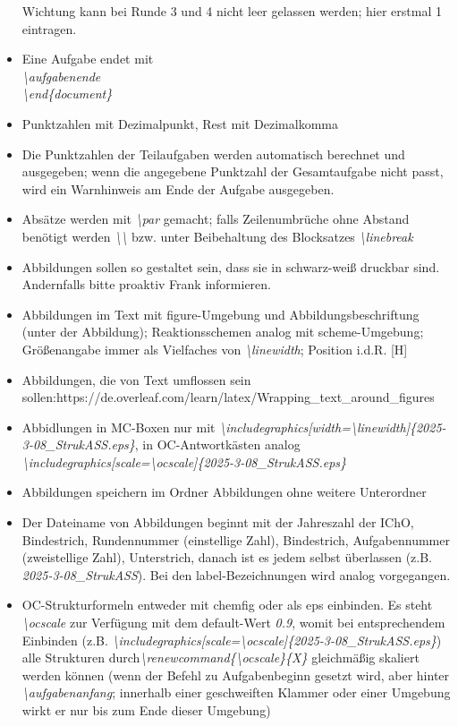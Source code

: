 \documentclass[./main.tex]{subfiles}
\begin{document}
\begin{itemize}
    Wichtung kann bei Runde 3 und 4 nicht leer gelassen werden; hier erstmal 1 eintragen.
    \item Eine Aufgabe endet mit \\
    \textit{\textbackslash aufgabenende}\\\textit{\textbackslash end\{document\}}
    \item Punktzahlen mit Dezimalpunkt, Rest mit Dezimalkomma
    \item Die Punktzahlen der Teilaufgaben werden automatisch berechnet und ausgegeben; wenn die angegebene Punktzahl der Gesamtaufgabe nicht passt, wird ein Warnhinweis am Ende der Aufgabe ausgegeben. 
    \item Abs\"atze werden mit \textit{\textbackslash par} gemacht; falls Zeilenumbr\"uche ohne Abstand ben\"otigt werden \textit{\textbackslash\textbackslash} bzw. unter Beibehaltung des Blocksatzes \textit{\textbackslash linebreak}
    \item Abbildungen sollen so gestaltet sein, dass sie in schwarz-wei\ss{} druckbar sind. Andernfalls bitte proaktiv Frank informieren. 
    \item Abbildungen im Text mit figure-Umgebung und Abbildungsbeschriftung (unter der Abbildung); Reaktionsschemen analog mit scheme-Umgebung; Gr\"o\ss{}enangabe immer als Vielfaches von \textit{\textbackslash linewidth}; Position i.d.R. [H]
    \item Abbildungen, die von Text umflossen sein sollen:\newline https://de.overleaf.com/learn/latex/Wrapping\_text\_around\_figures
    \item Abbidlungen in MC-Boxen nur mit \textit{\textbackslash includegraphics[width=\textbackslash linewidth]\{2025-3-08\_StrukASS.eps\}}, in OC-Antwortk\"asten analog \textit{\textbackslash includegraphics[scale=\textbackslash ocscale]\{2025-3-08\_StrukASS.eps\}}
    \item Abbildungen speichern im Ordner Abbildungen ohne weitere Unterordner
    \item Der Dateiname von Abbildungen beginnt mit der Jahreszahl der IChO, Bindestrich, Rundennummer (einstellige Zahl), Bindestrich, Aufgabennummer (zweistellige Zahl), Unterstrich, danach ist es jedem selbst \"uberlassen (z.B. \textit{2025-3-08\_StrukASS}). Bei den label-Bezeichnungen wird analog vorgegangen. 
    \item OC-Strukturformeln entweder mit chemfig oder als eps einbinden. Es steht \textit{\textbackslash ocscale} zur Verf\"ugung mit dem default-Wert \textit{0.9}, womit bei entsprechendem Einbinden (z.B. \linebreak\textit{\textbackslash includegraphics[scale=\textbackslash ocscale]\{2025-3-08\_StrukASS.eps\}}) alle Strukturen durch\linebreak \textit{\textbackslash renewcommand\{\textbackslash ocscale\}\{X\}} gleichm\"a\ss{}ig skaliert werden k\"onnen (wenn der Befehl zu Aufgabenbeginn gesetzt wird, aber hinter \textit{\textbackslash aufgabenanfang}; innerhalb einer geschweiften Klammer oder einer Umgebung wirkt er nur bis zum Ende dieser Umgebung)

\end{itemize}
\end{document}
